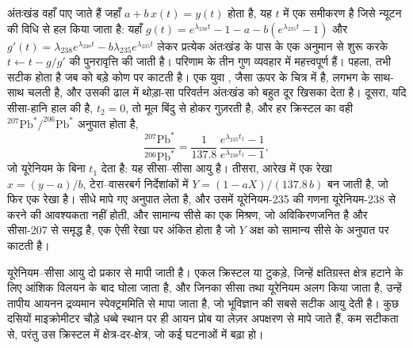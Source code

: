 
अंतःखंड वहाँ पाए जाते हैं जहाँ $a + b\,x(t) = y(t)$ होता है, यह $t$ में एक समीकरण है
जिसे न्यूटन की विधि से हल किया जाता है: यहाँ $g(t) = e^{\lambda_{238}t} - 1 - a -
b(e^{\lambda_{235}t} - 1)$ और $g'(t) = \lambda_{238}e^{\lambda_{238}t} -
b\lambda_{235}e^{\lambda_{235}t}$ लेकर प्रत्येक अंतःखंड के पास के एक अनुमान से शुरू करके $t \leftarrow t - g/g'$
की पुनरावृत्ति की जाती है। परिणाम के तीन गुण व्यवहार में महत्त्वपूर्ण हैं।
पहला,  तभी सटीक होता है जब   को
बड़े कोण पर काटती है। एक युवा , जैसा ऊपर के चित्र में है, लगभग
 के साथ-साथ चलती है, और उसकी ढाल में थोड़ा-सा परिवर्तन अंतःखंड को
बहुत दूर खिसका देता है। दूसरा, यदि सीसा-हानि हाल की है, $t_2 = 0$, तो 
मूल बिंदु से होकर गुज़रती है, और हर क्रिस्टल का वही
$^{207}\mathrm{Pb}^*/^{206}\mathrm{Pb}^*$ अनुपात होता है,
\[
\frac{^{207}\mathrm{Pb}^*}{^{206}\mathrm{Pb}^*} = \frac{1}{137.8}\,
\frac{e^{\lambda_{235}t_1} - 1}{e^{\lambda_{238}t_1} - 1},
\]
जो यूरेनियम के बिना $t_1$ देता है: यह सीसा--सीसा आयु है। तीसरा,  आरेख में एक रेखा
$x = (y - a)/b$, टेरा--वासरबर्ग निर्देशांकों में
$Y = (1 - aX)/(137.8\,b)$ बन जाती है, जो फिर एक रेखा है।  सीधे मापे गए अनुपात लेता है, और उसमें यूरेनियम-235 की गणना यूरेनियम-238 से करने की
आवश्यकता नहीं होती, और सामान्य सीसे का एक मिश्रण, जो अविकिरणजनित है और
सीसा-207 से समृद्ध है, एक ऐसी रेखा पर अंकित होता है जो $Y$ अक्ष को सामान्य
सीसे के अनुपात पर काटती है।

यूरेनियम--सीसा आयु दो प्रकार से मापी जाती है। एकल क्रिस्टल या टुकड़े,
जिन्हें क्षतिग्रस्त क्षेत्र हटाने के लिए आंशिक विलयन के बाद घोला जाता है,
और जिनका सीसा तथा यूरेनियम अलग किया जाता है, उन्हें तापीय आयनन
द्रव्यमान स्पेक्ट्रममिति से मापा जाता है, जो भूविज्ञान की सबसे सटीक आयु देती है। कुछ दसियों
माइक्रोमीटर चौड़े धब्बे स्थान पर ही आयन प्रोब या लेज़र अपक्षरण से मापे जाते हैं,
कम सटीकता से, परंतु उस क्रिस्टल में क्षेत्र-दर-क्षेत्र, जो
कई घटनाओं में बढ़ा हो।

